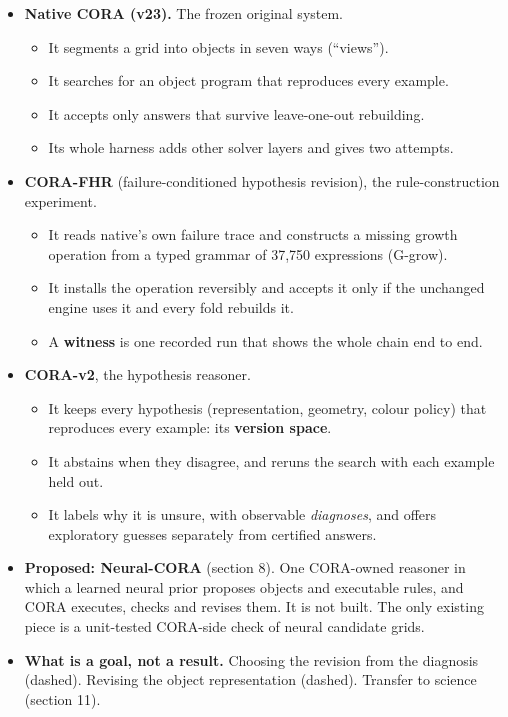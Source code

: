 \documentclass[11pt]{article}
\newcommand{\term}[1]{\textbf{#1}}
\begin{document}
\begin{itemize}
  \item \textbf{Native CORA (v23).} The frozen original system.
        \begin{itemize}
          \item It segments a grid into objects in seven ways (``views'').
          \item It searches for an object program that reproduces every example.
          \item It accepts only answers that survive leave-one-out rebuilding.
          \item Its whole harness adds other solver layers and gives two attempts.
        \end{itemize}
  \item \textbf{CORA-FHR} (failure-conditioned hypothesis revision), the rule-construction experiment.
        \begin{itemize}
          \item It reads native's own failure trace and constructs a missing growth operation from a typed grammar of
                37,750 expressions (G-grow).
          \item It installs the operation reversibly and accepts it only if the unchanged engine uses it and every
                fold rebuilds it.
          \item A \term{witness} is one recorded run that shows the whole chain end to end.
        \end{itemize}
  \item \textbf{CORA-v2}, the hypothesis reasoner.
        \begin{itemize}
          \item It keeps every hypothesis (representation, geometry, colour policy) that reproduces every example: its
                \term{version space}.
          \item It abstains when they disagree, and reruns the search with each example held out.
          \item It labels why it is unsure, with observable \emph{diagnoses}, and offers exploratory guesses
                separately from certified answers.
        \end{itemize}
  \item \textbf{Proposed: Neural-CORA} (section 8). One CORA-owned reasoner in which a learned neural prior proposes
        objects and executable rules, and CORA executes, checks and revises them. It is not built. The only existing
        piece is a unit-tested CORA-side check of neural candidate grids.
  \item \textbf{What is a goal, not a result.} Choosing the revision from the diagnosis (dashed). Revising the object
        representation (dashed). Transfer to science (section 11).
\end{itemize}
\end{document}
